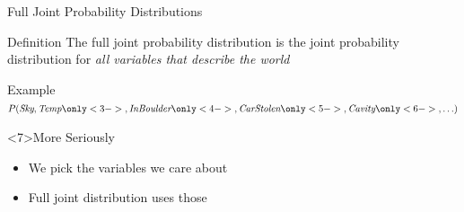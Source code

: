 \documentclass[14pt]{beamer}
\begin{document}
\begin{frame}{Full Joint Probability Distributions}
	\begin{block}{Definition}
		The \alert{full joint probability distribution} is the joint probability distribution for \emph{all variables that describe the world}
	\end{block}
	\pause
	\begin{block}{Example}
		$P(\textit{Sky},\textit{Temp}
		 \only<3->{,\textit{InBoulder}
		 \only<4->{,\textit{CarStolen}
		 \only<5->{,\textit{Cavity}
		 \only<6->{,\ldots}}}})$
	\end{block}
	\begin{block}{More Seriously}
		\begin{itemize}
			\item We pick the variables we care about
			\item Full joint distribution uses those
		\end{itemize}
	\end{block}
\end{frame}
\end{document}
